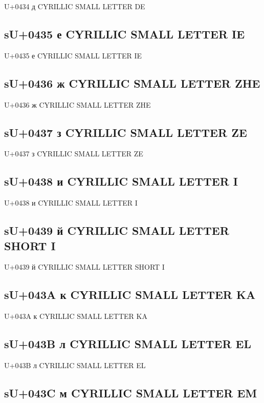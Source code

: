 U+0434 д  CYRILLIC SMALL LETTER DE

\subsection{sU+0435 е  CYRILLIC SMALL LETTER IE}

U+0435 е  CYRILLIC SMALL LETTER IE

\subsection{sU+0436 ж  CYRILLIC SMALL LETTER ZHE}

U+0436 ж  CYRILLIC SMALL LETTER ZHE

\subsection{sU+0437 з  CYRILLIC SMALL LETTER ZE}

U+0437 з  CYRILLIC SMALL LETTER ZE

\subsection{sU+0438 и  CYRILLIC SMALL LETTER I}

U+0438 и  CYRILLIC SMALL LETTER I

\subsection{sU+0439 й  CYRILLIC SMALL LETTER SHORT I}

U+0439 й  CYRILLIC SMALL LETTER SHORT I

\subsection{sU+043A к  CYRILLIC SMALL LETTER KA}

U+043A к  CYRILLIC SMALL LETTER KA

\subsection{sU+043B л  CYRILLIC SMALL LETTER EL}

U+043B л  CYRILLIC SMALL LETTER EL

\subsection{sU+043C м  CYRILLIC SMALL LETTER EM}

